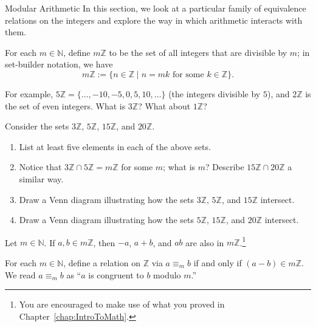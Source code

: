 \begin{section}{Modular Arithmetic}\label{sec:ModularArithmetic}
In this section, we look at a particular family of equivalence relations on the integers and explore the way in which arithmetic interacts with them.

\begin{definition}
For each $m\in \mathbb{N}$, define $m\mathbb{Z}$ to be the set of all integers that are divisible by $m$; in set-builder notation, we have
\[
m\mathbb{Z} := \{n \in \mathbb{Z}  \mid n = mk \text{ for some } k \in \mathbb{Z}\}.
\]
\end{definition}

For example, $5 \mathbb{Z} = \{ \ldots,-10,-5,0,5,10,\ldots\}$ (the integers divisible by $5$), and $2\mathbb{Z}$ is the set of even integers. What is $3\mathbb{Z}$? What about $1\mathbb{Z}$?

\begin{problem} 
Consider the sets $3 \mathbb{Z}$, $5 \mathbb{Z}$, $15 \mathbb{Z}$, and $20 \mathbb{Z}$.
\begin{enumerate}[label=\textrm{(\alph*)}]
\item List at least five elements in each of the above sets.
\item Notice that $3 \mathbb{Z} \cap5 \mathbb{Z} = m\mathbb{Z}$ for some $m$; what is $m$? Describe $15 \mathbb{Z}\cap 20 \mathbb{Z}$ a similar way.
\item Draw a Venn diagram illustrating how the sets $3 \mathbb{Z}$, $5 \mathbb{Z}$, and $15 \mathbb{Z}$ intersect.  
\item Draw a Venn diagram illustrating how the sets $5 \mathbb{Z}$, $15 \mathbb{Z}$, and $20 \mathbb{Z}$ intersect.
\end{enumerate}
\end{problem}

\begin{theorem}
Let $m\in \mathbb{N}$. If $a,b \in m \mathbb{Z}$, then $-a$, $a+b$, and $ab$ are also in $m \mathbb{Z}$.\footnote{You are encouraged to make use of what you proved in Chapter~\ref{chap:IntroToMath}.}
\end{theorem}

\begin{definition}\label{def:modulo}
For each  $m\in \mathbb{N}$,  define a relation on $\mathbb{Z}$ via $a\equiv_m b$ if and only if $(a-b) \in m\mathbb{Z}$. We read $a\equiv_m b$ as ``$a$ is congruent to $b$ modulo $m$.''
\end{definition}


\end{section}
